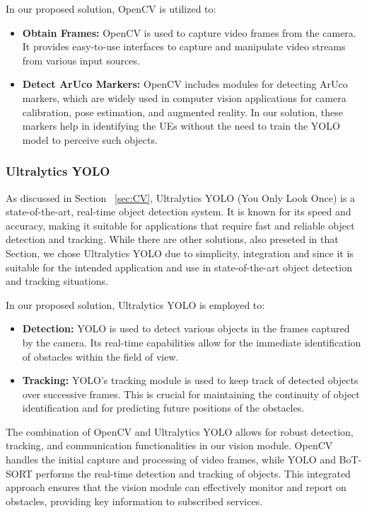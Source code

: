 In our proposed solution, OpenCV is utilized to:
\begin{itemize}
    \item \textbf{Obtain Frames:} OpenCV is used to capture video frames from the camera. It provides easy-to-use interfaces to capture and manipulate video streams from various input sources.
    \item \textbf{Detect ArUco Markers:} OpenCV includes modules for detecting ArUco markers, which are widely used in computer vision applications for camera calibration, pose estimation, and augmented reality. In our solution, these markers help in identifying the UEs without the need to train the YOLO model to perceive such objects.
\end{itemize}

\subsubsection{Ultralytics YOLO}
As discussed in Section ~\ref{sec:CV}, Ultralytics YOLO (You Only Look Once) is a state-of-the-art, real-time object detection system.
It is known for its speed and accuracy, making it suitable for applications that require fast and reliable object detection and tracking.
While there are other solutions, also preseted in that Section, we chose Ultralytics YOLO due to simplicity, integration and since it is suitable for the intended application and use in state-of-the-art object detection and tracking situations.

In our proposed solution, Ultralytics YOLO is employed to:
\begin{itemize}
    \item \textbf{Detection:} YOLO is used to detect various objects in the frames captured by the camera. Its real-time capabilities allow for the immediate identification of obstacles within the field of view.
    \item \textbf{Tracking:} YOLO’s tracking module is used to keep track of detected objects over successive frames. This is crucial for maintaining the continuity of object identification and for predicting future positions of the obstacles. %
\end{itemize}

The combination of OpenCV and Ultralytics YOLO allows for robust detection, tracking, and communication functionalities in our vision module.
OpenCV handles the initial capture and processing of video frames, while YOLO and BoT-SORT performs the real-time detection and tracking of objects.
This integrated approach ensures that the vision module can effectively monitor and report on obstacles, providing key information to subscribed services.


